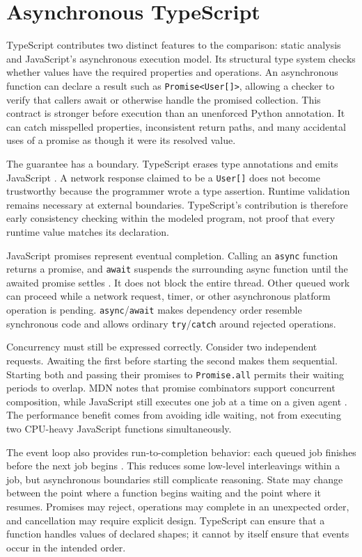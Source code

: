 \documentclass[12pt]{article}
\begin{document}
\section{Asynchronous TypeScript}

TypeScript contributes two distinct features to the comparison: static analysis and JavaScript's asynchronous execution model. Its structural type system checks whether values have the required properties and operations. An asynchronous function can declare a result such as \texttt{Promise<User[]>}, allowing a checker to verify that callers await or otherwise handle the promised collection. This contract is stronger before execution than an unenforced Python annotation. It can catch misspelled properties, inconsistent return paths, and many accidental uses of a promise as though it were its resolved value.


The guarantee has a boundary. TypeScript erases type annotations and emits JavaScript \cite{ref1}. A network response claimed to be a \texttt{User[]} does not become trustworthy because the programmer wrote a type assertion. Runtime validation remains necessary at external boundaries. TypeScript's contribution is therefore early consistency checking within the modeled program, not proof that every runtime value matches its declaration.


JavaScript promises represent eventual completion. Calling an \texttt{async} function returns a promise, and \texttt{await} suspends the surrounding async function until the awaited promise settles \cite{ref8}. It does not block the entire thread. Other queued work can proceed while a network request, timer, or other asynchronous platform operation is pending. \texttt{async}/\texttt{await} makes dependency order resemble synchronous code and allows ordinary \texttt{try}/\texttt{catch} around rejected operations.


Concurrency must still be expressed correctly. Consider two independent requests. Awaiting the first before starting the second makes them sequential. Starting both and passing their promises to \texttt{Promise.all} permits their waiting periods to overlap. MDN notes that promise combinators support concurrent composition, while JavaScript still executes one job at a time on a given agent \cite{ref9}. The performance benefit comes from avoiding idle waiting, not from executing two CPU-heavy JavaScript functions simultaneously.


The event loop also provides run-to-completion behavior: each queued job finishes before the next job begins \cite{ref7}. This reduces some low-level interleavings within a job, but asynchronous boundaries still complicate reasoning. State may change between the point where a function begins waiting and the point where it resumes. Promises may reject, operations may complete in an unexpected order, and cancellation may require explicit design. TypeScript can ensure that a function handles values of declared shapes; it cannot by itself ensure that events occur in the intended order.
\end{document}
